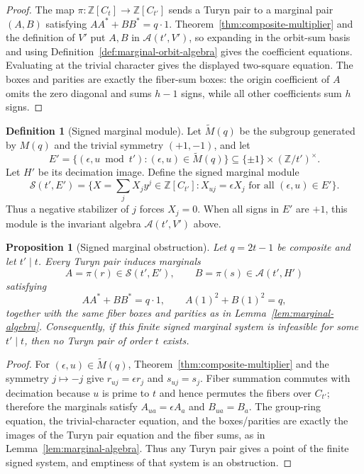\documentclass[11pt]{article}
\theoremstyle{plain}
\newtheorem{proposition}[theorem]{Proposition}
\theoremstyle{definition}
\newtheorem{definition}[theorem]{Definition}
\theoremstyle{remark}
\newcommand{\Z}{\mathbb Z}
\begin{document}
\begin{proof}
The map $\pi:\Z[C_t]\to\Z[C_{t'}]$ sends a Turyn pair to a marginal pair
$(A,B)$ satisfying $AA^*+BB^*=q\cdot1$. Theorem~\ref{thm:composite-multiplier}
and the definition of $V'$ put $A,B$ in $\mathcal A(t',V')$, so expanding in the
orbit-sum basis and using Definition~\ref{def:marginal-orbit-algebra} gives the
coefficient equations. Evaluating at the trivial character gives the displayed
two-square equation. The boxes and parities are exactly the fiber-sum boxes:
the origin coefficient of $A$ omits the zero diagonal and sums $h-1$ signs,
while all other coefficients sum $h$ signs.
\end{proof}

\begin{definition}[Signed marginal module]\label{def:signed-marginal-module}
Let $\widetilde M(q)$ be the subgroup generated by $M(q)$ and the trivial
symmetry $(+1,-1)$, and let
\[
  E'=\{(\epsilon,u\bmod t'):(\epsilon,u)\in\widetilde M(q)\}
  \subseteq\{\pm1\}\times(\Z/t')^\times .
\]
Let $H'$ be its decimation image.  Define the signed marginal module
\[
  \mathcal S(t',E')=
  \{X=\sum_j X_jy^j\in\Z[C_{t'}]: X_{uj}=\epsilon X_j
    \text{ for all }(\epsilon,u)\in E'\}.
\]
Thus a negative stabilizer of $j$ forces $X_j=0$.  When all signs in $E'$ are
$+1$, this module is the invariant algebra $\mathcal A(t',V')$ above.
\end{definition}

\begin{proposition}[Signed marginal obstruction]\label{prop:signed-marginal}
Let $q=2t-1$ be composite and let $t'\mid t$.  Every Turyn pair induces
marginals
\[
  A=\pi(r)\in\mathcal S(t',E'),\qquad
  B=\pi(s)\in\mathcal A(t',H')
\]
satisfying
\[
  AA^*+BB^*=q\cdot1,\qquad A(1)^2+B(1)^2=q,
\]
together with the same fiber boxes and parities as in
Lemma~\ref{lem:marginal-algebra}.  Consequently, if this finite signed
marginal system is infeasible for some $t'\mid t$, then no Turyn pair of order
$t$ exists.
\end{proposition}

\begin{proof}
For $(\epsilon,u)\in\widetilde M(q)$, Theorem~\ref{thm:composite-multiplier}
and the symmetry $j\mapsto-j$ give $r_{uj}=\epsilon r_j$ and $s_{uj}=s_j$.
Fiber summation commutes with decimation because $u$ is prime to $t$ and hence
permutes the fibers over $C_{t'}$; therefore the marginals satisfy
$A_{ua}=\epsilon A_a$ and $B_{ua}=B_a$.  The group-ring equation, the
trivial-character equation, and the boxes/parities are exactly the images of
the Turyn pair equation and the fiber sums, as in
Lemma~\ref{lem:marginal-algebra}.  Thus any Turyn pair gives a point of the
finite signed system, and emptiness of that system is an obstruction.
\end{proof}
\end{document}
